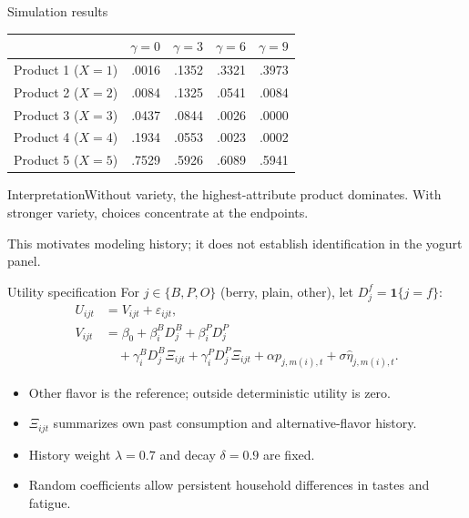 \documentclass[aspectratio=169,11pt]{beamer}
\begin{document}
\begin{frame}[noframenumbering,label=simulation-results]{Simulation results}
\centering
\begin{tabular}{lrrrr}\toprule
 & $\gamma=0$ & $\gamma=3$ & $\gamma=6$ & $\gamma=9$\\\midrule
Product 1 ($X=1$) & .0016 & .1352 & .3321 & .3973\\
Product 2 ($X=2$) & .0084 & .1325 & .0541 & .0084\\
Product 3 ($X=3$) & .0437 & .0844 & .0026 & .0000\\
Product 4 ($X=4$) & .1934 & .0553 & .0023 & .0002\\
Product 5 ($X=5$) & .7529 & .5926 & .6089 & .5941\\\bottomrule
\end{tabular}
\begin{block}{Interpretation}Without variety, the highest-attribute product dominates. With stronger variety, choices concentrate at the endpoints.\end{block}
\small This motivates modeling history; it does not establish identification in the yogurt panel.
\par\smallskip
\hyperlink{simulation-procedure}{}\quad \hyperlink{demand-model}{}
\end{frame}

\begin{frame}[noframenumbering,label=utility-specification]{Utility specification}
\small
For $j\in\{B,P,O\}$ (berry, plain, other), let $D_j^f=\mathbf1\{j=f\}$:
\[
\begin{aligned}
U_{ijt}&=V_{ijt}+\varepsilon_{ijt},\\
V_{ijt}&=\beta_0+\beta_i^B D_j^B+\beta_i^P D_j^P\\
&\quad+\gamma_i^B D_j^B\Xi_{ijt}
+\gamma_i^P D_j^P\Xi_{ijt}
+\alpha p_{j,m(i),t}+\sigma\hat\eta_{j,m(i),t}.
\end{aligned}
\]
\begin{itemize}
\item Other flavor is the reference; outside deterministic utility is zero.
\item $\Xi_{ijt}$ summarizes own past consumption and alternative-flavor history.
\item History weight $\lambda=0.7$ and decay $\delta=0.9$ are fixed.
\item Random coefficients allow persistent household differences in tastes and fatigue.
\end{itemize}
\par\smallskip
\hyperlink{demand-model}{}
\end{frame}
\end{document}
